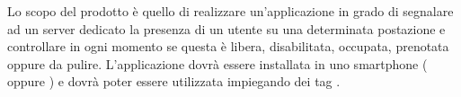 Lo scopo del prodotto è quello di realizzare un’applicazione in grado di segnalare
 ad un server dedicato la presenza di un utente su una determinata postazione e 
 controllare in ogni momento se questa è libera, disabilitata, occupata, prenotata oppure da pulire. 
 L’applicazione dovrà essere installata in uno smartphone ( oppure ) e dovrà poter essere 
 utilizzata impiegando dei tag .